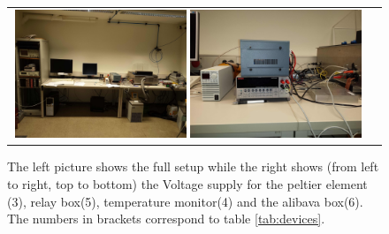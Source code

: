 \documentclass{article}
\begin{document}
\begin{figure}[tbhn]
\begin{center}
\begin{tabular}{cc}
\includegraphics[width=0.49\textwidth]{pictures/FullSetup.jpg}
\includegraphics[width=0.49\textwidth]{pictures/MainUnits.jpg}
\end{tabular}
\end{center}
\caption{The left picture shows the full setup while the right shows (from left to right, top to bottom) the Voltage supply for the peltier element (3), relay box(5), temperature monitor(4) and the alibava box(6). The numbers in brackets correspond to table \ref{tab:devices}. }
\label{fig:MainUnits}
\end{figure}
\end{document}
